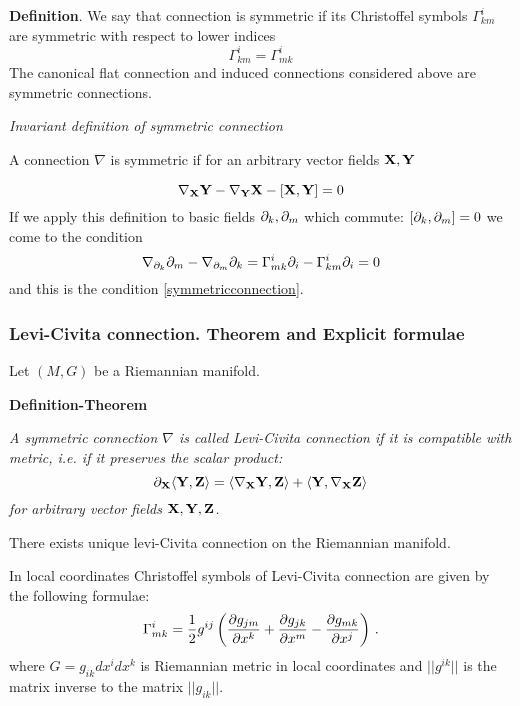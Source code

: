 \documentclass[12pt]{article}
\theoremstyle{theorem}
\numberwithin{equation}{section}
\begin{document}
 {\bf Definition}. We say that connection is symmetric if its Christoffel symbols $\Gamma^i_{km}$ are symmetric with respect to
  lower indices
  \begin{equation}\label{symmetricconnection}
    \Gamma^i_{km}=\Gamma^i_{mk}
  \end{equation}
  The canonical flat connection and induced connections considered above are symmetric connections.

  \m

  {\small

   \centerline {\it Invariant definition of symmetric connection}

  A connection $\nabla$ is symmetric if for an arbitrary vector fields ${\bf X},{\bf Y}$

  \begin{equation}\label{symmetricconnectioninvariant}
    \nabla_{\bf X} {\bf Y}-\nabla_{\bf Y} {\bf X}-[{\bf X},{\bf Y}]=0
  \end{equation}
  If we apply this definition to basic fields $\partial_k,\partial_m$ which commute: $[\partial_k,\partial_m]=0$
  we come to the
  condition
          $$
     \nabla_{\partial_k}\partial_m-\nabla_{\partial_m}\partial_k=\Gamma_{mk}^i\partial_i-\Gamma_{km}^i\partial_i=0
          $$
 and this is the condition  \eqref{symmetricconnection}.
  }



  \subsubsection {Levi-Civita connection. 
Theorem and Explicit formulae}\label{levicivitaconnection1}
Let $(M, G)$ be a Riemannian manifold.

{\bf Definition-Theorem}

{\it A symmetric connection $\nabla$ is called Levi-Civita connection if it is compatible with metric, i.e.
if it preserves the scalar product:
        \begin{equation}\label{connpreservingmetric}
  \partial_{\bf X}\langle{\bf Y},{\bf Z}\rangle=\langle\nabla_{\bf X}{\bf Y},{\bf Z}\rangle+\langle{\bf Y},\nabla_{\bf X}{\bf Z}\rangle
        \end{equation}
        for arbitrary vector fields ${\bf X},{\bf Y},{\bf Z}$.

  There exists unique levi-Civita connection on the Riemannian manifold.

  In local coordinates Christoffel symbols of Levi-Civita connection are given by the following formulae:
 \begin{equation}\label{levi-civitaformula}
    \Gamma^i_{mk}={1\over 2}g^{ij}\left({\partial g_{jm}\over\partial x^k}+
    {\partial g_{jk}\over\partial x^m}-{\partial g_{mk}\over \partial x^j}\right)\,.
 \end{equation}
 where $G=g_{ik}dx^idx^k$ is Riemannian metric in local coordinates and
 $||g^{ik}||$ is the matrix inverse to the matrix $||g_{ik}||$.

 }
\end{document}
